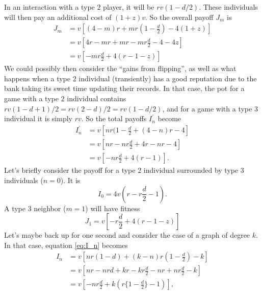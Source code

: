 \documentclass[14pt, a4paper, justified]{article}
\begin{document}
In an interaction with a type $2$ player, it will be $rv(1-d/2)$.
These individuals will then pay an additional cost of $(1 + z)v$.
So the overall payoff $J_m$ is
\begin{equation}
    \begin{split}
        J_m & = v[(4-m)r + mr(1 - \frac{d}{2}) - 4(1+z)] \\
        & = v[4r - mr + mr - mr\frac{d}{2} - 4 - 4z] \\
        & = v[- mr\frac{d}{2} + 4(r - 1 - z)]
    \end{split}
    \label{eq:J_m}
\end{equation}
We could possibly then consider the ``gains from flipping'', as well as what happens when a type $2$ individual (transiently) has a good reputation due to the bank taking its sweet time updating their records.
In that case, the pot for a game with a type $2$ individual contains $rv(1 - d + 1)/2 = rv(2-d)/2 = rv(1-d/2)$, and for a game with a type $3$ individual it is simply $rv$.
So the total payoffs $I^\prime_n$ become
\begin{equation}
    \begin{split}
        I^\prime_n & = v [nr(1-\frac{d}{2} + (4-n)r - 4]\\
        & = v[nr - nr\frac{d}{2} + 4r - nr - 4]\\
        & = v[-nr\frac{d}{2} + 4(r - 1)].
    \end{split}
    \label{eq:Iprime_n}
\end{equation}
Let's briefly consider the payoff for a type $2$ individual surrounded by type $3$ individuals ($n = 0$).
It is
\begin{equation}
    I_0 = 4v(r - r\frac{d}{2} - 1).
\end{equation}
A type $3$ neighbor ($m = 1$) will have fitness
\begin{equation}
    J_1 = v[- r\frac{d}{2} + 4(r - 1 - z)]
\end{equation}
Let's maybe back up for one second and consider the case of a graph of degree $k$.
In that case, equation \ref{eq:I_n} becomes
\begin{equation}
    \begin{split}
        I_n & = v [nr(1-d) + (k-n)r(1 - \frac{d}{2}) - k]\\
        & = v[nr - nrd + kr - kr\frac{d}{2} - nr + nr\frac{d}{2} - k] \\
        & = v[-nr\frac{d}{2} + k(r\{1 - \frac{d}{2}\} - 1)],
    \end{split}
\end{equation}
\end{document}
